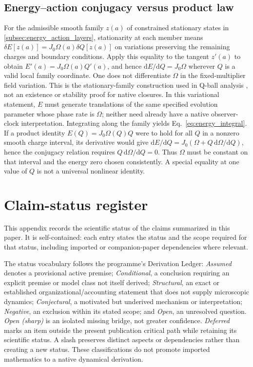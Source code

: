 \documentclass[11pt]{article}
\theoremstyle{definition}
\newcommand{\dd}{\mathrm{d}}
\begin{document}
\subsection{Energy--action conjugacy versus product law}
\label{subsec:conjugacy-proof}
For the admissible smooth family $z(a)$ of constrained stationary states in
\cref{subsec:energy_action_layers}, stationarity at each member means
$\delta E[z(a)]=J_0\Omega(a)\delta Q[z(a)]$ on variations preserving the
remaining charges and boundary conditions.  Apply this equality to the tangent
$z'(a)$ to obtain $E'(a)=J_0\Omega(a)Q'(a)$, and hence
$\dd E/\dd Q=J_0\Omega$ wherever $Q$ is a valid local family coordinate.
One does not differentiate $\Omega$ in the fixed-multiplier field variation.
This is the stationary-family construction used in Q-ball analysis
\cite{Coleman1985Qballs}, not an existence or stability proof for native closures.  In this variational statement,
$E$ must generate translations of the same specified evolution parameter whose phase
rate is $\Omega$; neither need already have a native observer-clock interpretation.
Integrating along the family yields Eq.~\eqref{eq:energy_integral}.
If a product identity $E(Q)=J_0\Omega(Q)Q$ were to hold for all $Q$ in a nonzero
smooth charge interval, its derivative would give
$\dd E/\dd Q=J_0(\Omega+Q\,\dd\Omega/\dd Q)$, hence the conjugacy relation requires
$Q\,\dd\Omega/\dd Q=0$.  Thus $\Omega$ must be constant on that interval and the
energy zero chosen consistently.  A special equality at one value of $Q$ is not
a universal nonlinear identity.

\section{Claim-status register}
\label{app:status}

This appendix records the scientific status of the claims summarized in this paper.  It is self-contained: each entry states the status and the scope required for that status, including imported or companion-paper dependencies where relevant.

The status vocabulary follows the programme's Derivation Ledger:
\emph{Assumed} denotes a provisional active premise; \emph{Conditional}, a
conclusion requiring an explicit premise or model class not itself derived;
\emph{Structural}, an exact or established organizational/accounting statement
that does not supply microscopic dynamics; \emph{Conjectural}, a motivated but
underived mechanism or interpretation; \emph{Negative}, an exclusion within its
stated scope; and \emph{Open}, an unresolved question.  \emph{Open (sharp)}
is an isolated missing bridge, not greater confidence.  \emph{Deferred} marks
an item outside the present publication critical path while retaining its
scientific status.  A slash preserves distinct aspects or dependencies rather
than creating a new status.  These classifications do not promote imported
mathematics to a native dynamical derivation.
\end{document}
